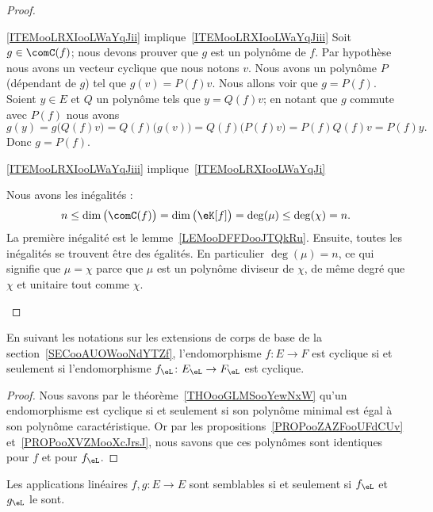 \begin{proof}
\begin{subproof}
		\item[\ref{ITEMooLRXIooLWaYqJii} implique~\ref{ITEMooLRXIooLWaYqJiii}]
		Soit \( g\in \comC(f)\); nous devons prouver que \( g\) est un polynôme de \( f\). Par hypothèse nous avons un vecteur cyclique que nous notons \( v\). Nous avons un polynôme \( P\) (dépendant de \( g\)) tel que \( g(v)=P(f)v\). Nous allons voir que \( g=P(f)\). Soient \( y\in E\) et \( Q\) un polynôme tels que \( y=Q(f)v\); en notant que \( g\) commute avec \( P(f)\) nous avons
		\begin{equation}
			g(y)=g\big( Q(f)v \big)=Q(f)\big( g(v) \big)=Q(f)\big( P(f)v \big)=P(f)Q(f)v=P(f)y.
		\end{equation}
		Donc \( g=P(f)\).

		\item[\ref{ITEMooLRXIooLWaYqJiii} implique~\ref{ITEMooLRXIooLWaYqJi}]

		Nous avons les inégalités :
		\begin{equation}
			n\leq \dim\big( \comC(f) \big)=\dim\big( \eK[f] \big)=\deg(\mu)\leq \deg(\chi)=n.
		\end{equation}
		La première inégalité est le lemme~\ref{LEMooDFFDooJTQkRu}. Ensuite, toutes les inégalités se trouvent être des égalités. En particulier \( \deg(\mu)=n\), ce qui signifie que \( \mu=\chi\) parce que \( \mu\) est un polynôme diviseur de \( \chi\), de même degré que \( \chi\) et unitaire tout comme \( \chi\).

	\end{subproof}
\end{proof}

\begin{corollary}        \label{CORooAKQEooSliXPp}
	En suivant les notations sur les extensions de corps de base de la section~\ref{SECooAUOWooNdYTZf}, l'endomorphisme \( f\colon E\to F\) est cyclique si et seulement si l'endomorphisme \( f_{\eL}\colon E_{\eL}\to F_{\eL}\) est cyclique.
\end{corollary}

\begin{proof}
	Nous savons par le théorème~\ref{THOooGLMSooYewNxW} qu'un endomorphisme est cyclique si et seulement si son polynôme minimal est égal à son polynôme caractéristique. Or par les propositions~\ref{PROPooZAZFooUFdCUv} et~\ref{PROPooXVZMooXcJrsJ}, nous savons que ces polynômes sont identiques pour \( f\) et pour \( f_{\eL}\).
\end{proof}

\begin{theorem}      \label{THOooHUFBooReKZWG}
	Les applications linéaires \( f,g\colon E\to E\) sont semblables si et seulement si \( f_{\eL}\) et \( g_{\eL}\) le sont.
\end{theorem}

